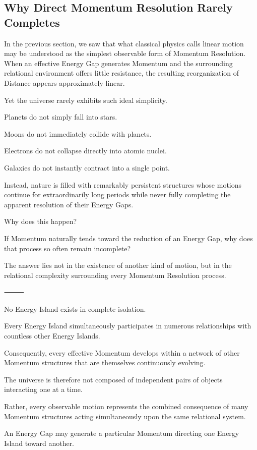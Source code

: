 \subsection*{\textbf{Why Direct Momentum Resolution Rarely Completes}}


In the previous section, we saw that what classical physics calls linear motion may be understood as the simplest observable form of Momentum Resolution. When an effective Energy Gap generates Momentum and the surrounding relational environment offers little resistance, the resulting reorganization of Distance appears approximately linear.

Yet the universe rarely exhibits such ideal simplicity.

Planets do not simply fall into stars.

Moons do not immediately collide with planets.

Electrons do not collapse directly into atomic nuclei.

Galaxies do not instantly contract into a single point.

Instead, nature is filled with remarkably persistent structures whose motions continue for extraordinarily long periods while never fully completing the apparent resolution of their Energy Gaps.

Why does this happen?

If Momentum naturally tends toward the reduction of an Energy Gap, why does that process so often remain incomplete?

The answer lies not in the existence of another kind of motion, but in the relational complexity surrounding every Momentum Resolution process.

⸻

No Energy Island exists in complete isolation.

Every Energy Island simultaneously participates in numerous relationships with countless other Energy Islands.

Consequently, every effective Momentum develops within a network of other Momentum structures that are themselves continuously evolving.

The universe is therefore not composed of independent pairs of objects interacting one at a time.

Rather, every observable motion represents the combined consequence of many Momentum structures acting simultaneously upon the same relational system.

An Energy Gap may generate a particular Momentum directing one Energy Island toward another.

